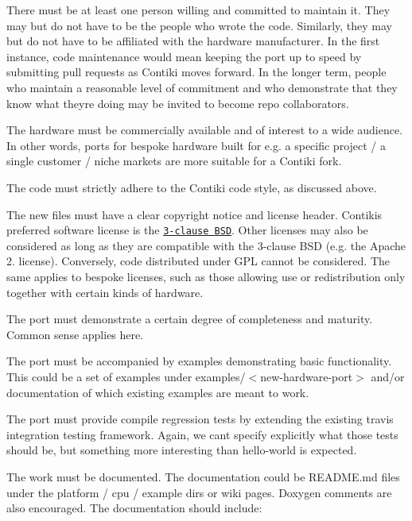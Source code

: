 \begin{DoxyItemize}
\item There must be at least one person willing and committed to maintain it. They may but do not have to be the people who wrote the code. Similarly, they may but do not have to be affiliated with the hardware manufacturer. In the first instance, code maintenance would mean keeping the port up to speed by submitting pull requests as Contiki moves forward. In the longer term, people who maintain a reasonable level of commitment and who demonstrate that they know what they\textquotesingle{}re doing may be invited to become repo collaborators.
\item The hardware must be commercially available and of interest to a wide audience. In other words, ports for bespoke hardware built for e.\+g. a specific project / a single customer / niche markets are more suitable for a Contiki fork.
\item The code must strictly adhere to the Contiki code style, as discussed above.
\item The new files must have a clear copyright notice and license header. Contiki\textquotesingle{}s preferred software license is the \href{http://opensource.org/licenses/BSD-3-Clause}{\tt 3-\/clause B\+S\+D}. Other licenses may also be considered as long as they are compatible with the 3-\/clause B\+S\+D (e.\+g. the Apache 2. license). Conversely, code distributed under G\+P\+L cannot be considered. The same applies to bespoke licenses, such as those allowing use or redistribution only together with certain kinds of hardware.
\item The port must demonstrate a certain degree of completeness and maturity. Common sense applies here.
\item The port must be accompanied by examples demonstrating basic functionality. This could be a set of examples under {\ttfamily examples/$<$new-\/hardware-\/port$>$} and/or documentation of which existing examples are meant to work.
\item The port must provide compile regression tests by extending the existing travis integration testing framework. Again, we can\textquotesingle{}t specify explicitly what those tests should be, but something more interesting than hello-\/world is expected.
\item The work must be documented. The documentation could be R\+E\+A\+D\+M\+E.\+md files under the platform / cpu / example dirs or wiki pages. Doxygen comments are also encouraged. The documentation should include\+:

\end{DoxyItemize}
